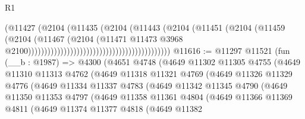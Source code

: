 \begin{lexlean}{R1}
\begin{coremodule}
                                                                  (@11427
                                                                    (@2104
                                                                      (@11435
                                                                        (@2104
                                                                          (@11443
                                                                            (@2104
                                                                              (@11451
                                                                                (@2104
                                                                                  (@11459
                                                                                    (@2104
                                                                                      (@11467
                                                                                        (@2104
                                                                                          (@11471
                                                                                            @11473
                                                                                            @3968
                                                                                            @2100))))))))))))))))))))))))))))))))))))))))))))
@11616 := @11297
    @11521
    (fun (__b : @1987) =>
    @4300
      (@4651
        @4748
        (@4649
          @11302
          @11305
          @4755
          (@4649
            @11310
            @11313
            @4762
            (@4649
              @11318
              @11321
              @4769
              (@4649
                @11326
                @11329
                @4776
                (@4649
                  @11334
                  @11337
                  @4783
                  (@4649
                    @11342
                    @11345
                    @4790
                    (@4649
                      @11350
                      @11353
                      @4797
                      (@4649
                        @11358
                        @11361
                        @4804
                        (@4649
                          @11366
                          @11369
                          @4811
                          (@4649
                            @11374
                            @11377
                            @4818
                            (@4649
                              @11382

\end{coremodule}
\end{lexlean}
